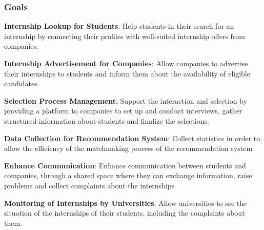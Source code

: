     \subsubsection{Goals}
        \begin{enumerate}[label={[G\arabic*]}]
            \item \textbf{Internship Lookup for Students}: 
                Help students in their search for an internship by connecting their profiles with well-suited internship offers from companies.
            \item \textbf{Internship Advertisement for Companies}: 
                Allow companies to advertise their internships to students and inform them about the availability of eligible candidates.
            \item \textbf{Selection Process Management}: 
                Support the interaction and selection by providing a platform to companies to set up and conduct interviews, gather structured information about students and finalize the selections.
            \item \textbf{Data Collection for Recommendation System}: 
                Collect statistics in order to allow the efficiency of the matchmaking process of the recommendation system 
            \item \textbf{Enhance Communication}: 
                Enhance communication between students and companies, through a shared space where they can exchange information, raise problems and collect complaints about the internships
            \item \textbf{Monitoring of Internships by Universities}: 
                Allow universities to see the situation of the internships of their students, including the complaints about them.
        \end{enumerate}


